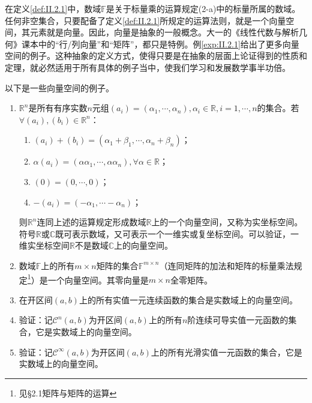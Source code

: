 \documentclass[../main.tex]{subfiles}
\begin{document}
在定义\ref{def:II.2.1}中，数域$\mathbb{F}$是关于标量乘的运算规定(2-a)中的标量所属的数域。任何非空集合，只要配备了定义\ref{def:II.2.1}所规定的运算法则，就是一个向量空间，其元素就是向量。因此，向量是抽象的一般概念。大一的《线性代数与解析几何》课本中的“行/列向量”和“矩阵”，都只是特例。例\ref{exp:II.2.1}给出了更多向量空间的例子。这种抽象的定义方式，使得只要是在抽象的层面上论证得到的性质和定理，就必然适用于所有具体的例子当中，使我们学习和发展数学事半功倍。

\begin{example}\label{exp:II.2.1}
    以下是一些向量空间的例子。
    \begin{enumerate}
        \item $\mathbb{R}^n$是所有有序实数$n$元组$\left(a_i\right)=\left(\alpha_1,\cdots,\alpha_n\right),\alpha_i\in\mathbb{R},i=1,\cdots,n$的集合。若$\forall \left(a_i\right),\left(b_i\right)\in\mathbb{R}^n$：
              \begin{enumerate}
                  \item $\left(a_i\right)+\left(b_i\right)=\left(\alpha_1+\beta_1,\cdots,\alpha_n+\beta_n\right)$；
                  \item $\alpha\left(a_i\right)=\left(\alpha\alpha_1,\cdots,\alpha\alpha_n\right),\forall\alpha\in\mathbb{R}$；
                  \item $\left(0\right)=\left(0,\cdots,0\right)$；
                  \item $-\left(a_i\right)=\left(-\alpha_1,\cdots-\alpha_n\right)$；
              \end{enumerate}
              则$\mathbb{R}^n$连同上述的运算规定形成数域$\mathbb{R}$上的一个向量空间，又称为实坐标空间。符号$\mathbb{R}$或$\mathbb{C}$既可表示数域，又可表示一个一维实或复坐标空间。可以验证，一维实坐标空间$\mathbb{R}$不是数域$\mathbb{C}$上的向量空间。
        \item 数域$\mathbb{F}$上的所有$m\times n$矩阵的集合$\mathbb{F}^{m\times n}$（连同矩阵的加法和矩阵的标量乘法规定\footnote{见\cite{周胜林2012线性代数}\S 2.1矩阵与矩阵的运算}）是一个向量空间。其零向量是$m\times n$全零矩阵。
        \item 在开区间$\left(a,b\right)$上的所有实值一元连续函数的集合是实数域上的向量空间。
        \item 验证：记$\mathcal{C}^n\left(a,b\right)$为开区间$\left(a,b\right)$上的所有$n$阶连续可导实值一元函数的集合，它是实数域上的向量空间。
        \item 验证：记$\mathcal{C}^\infty\left(a,b\right)$为开区间$\left(a,b\right)$上的所有光滑实值一元函数的集合，它是实数域上的向量空间。
    \end{enumerate}
\end{example}
\end{document}
